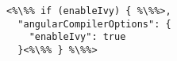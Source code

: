 \begin{verbatim}
<%\%% if (enableIvy) { %\%%>,
  "angularCompilerOptions": {
    "enableIvy": true
  }<%\%% } %\%%>
\end{verbatim}
